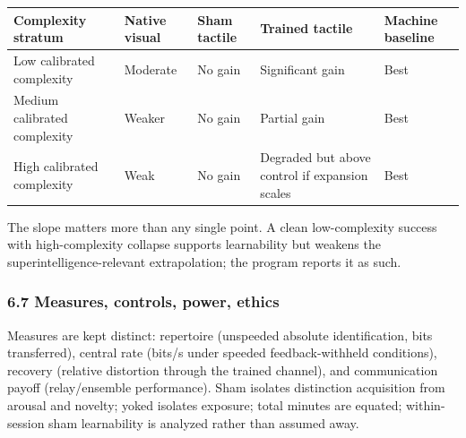 \documentclass[
  11pt,
]{article}
\newcounter{none} %
\begin{document}
{\def\LTcaptype{none} %
\begin{longtable}[]{@{}
  >{\raggedright\arraybackslash}p{}
  >{\raggedright\arraybackslash}p{}
  >{\raggedright\arraybackslash}p{}
  >{\raggedright\arraybackslash}p{}
  >{\raggedright\arraybackslash}p{}@{}}
\toprule\noalign{}
\begin{minipage}[b]{\linewidth}\raggedright
Complexity stratum
\end{minipage} &
\begin{minipage}[b]{\linewidth}\raggedright
Native visual
\end{minipage} &
\begin{minipage}[b]{\linewidth}\raggedright
Sham tactile
\end{minipage} &
\begin{minipage}[b]{\linewidth}\raggedright
Trained tactile
\end{minipage} &
\begin{minipage}[b]{\linewidth}\raggedright
Machine baseline
\end{minipage} \\
\midrule\noalign{}
\endhead
\bottomrule\noalign{}
\endlastfoot
Low calibrated complexity & Moderate & No gain &
Significant gain & Best \\
Medium calibrated complexity & Weaker & No gain
& Partial gain & Best \\
High calibrated complexity & Weak & No gain &
Degraded but above control if expansion scales &
Best \\
\end{longtable}
}

The slope matters more than any single point. A
clean low-complexity success with
high-complexity collapse supports learnability
but weakens the superintelligence-relevant
extrapolation; the program reports it as such.

\subsubsection{6.7 Measures, controls, power,
ethics}\label{measures-controls-power-ethics}

Measures are kept distinct: repertoire
(unspeeded absolute identification, bits
transferred), central rate (bits/s under speeded
feedback-withheld conditions), recovery
(relative distortion through the trained
channel), and communication payoff
(relay/ensemble performance). Sham isolates
distinction acquisition from arousal and
novelty; yoked isolates exposure; total minutes
are equated; within-session sham learnability is
analyzed rather than assumed away.
\end{document}
